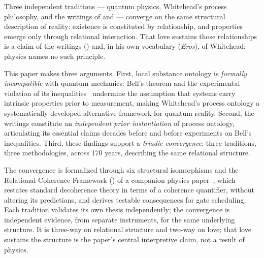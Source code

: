 
Three independent traditions --- quantum physics, Whitehead's process
philosophy, and the \bahai writings of \Bahaullah and \AbdulBaha --- converge
on the same structural description of reality: existence is constituted by
relationship, and properties emerge only through relational interaction.
That love sustains those relationships is a claim of the \bahai writings
(\mahabbat) and, in his own vocabulary (\emph{Eros}), of Whitehead; physics
names no such principle.

This paper makes three arguments. First, local substance ontology is
\emph{formally incompatible} with quantum mechanics: Bell's theorem and the
experimental violation of its
inequalities~\citep{Bell1964,Aspect1982,Hensen2015} undermine the
assumption that systems carry intrinsic properties prior to measurement,
making Whitehead's process ontology a systematically developed alternative
framework for quantum reality. Second, the \bahai writings constitute an
\emph{independent prior instantiation} of process ontology, articulating its
essential claims decades before \citet{Whitehead1929} and before experiments
on Bell's inequalities. Third, these findings support a \emph{triadic
convergence}: three traditions, three methodologies, across 170 years,
describing the same relational structure.

The convergence is formalized through six structural isomorphisms and the
Relational Coherence Framework (\RCF) of a companion physics
paper~\citep{Adams2026Physics}, which restates standard decoherence theory
in terms of a coherence quantifier, without altering its predictions, and
derives testable consequences for gate scheduling. Each
tradition validates its own thesis independently; the convergence is
independent evidence, from separate instruments, for the same underlying
structure. It is three-way on relational structure and two-way on love; that love
sustains the structure is the paper's central interpretive claim, not a
result of physics.
